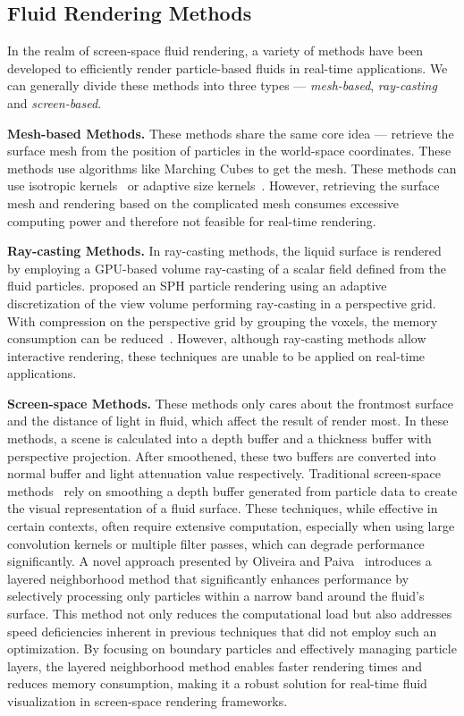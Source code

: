 \documentclass[sigconf]{acmart}
\begin{document}
\subsection{Fluid Rendering Methods}
In the realm of screen-space fluid rendering, a variety of methods have been developed to efficiently render particle-based fluids in real-time applications. We can generally divide these methods into three types --- \textit{mesh-based}, \textit{ray-casting} and \textit{screen-based}.

\textbf{Mesh-based Methods.} These methods share the same core idea --- retrieve the surface mesh from the position of particles in the world-space coordinates. These methods use algorithms like Marching Cubes to get the mesh. These methods
can use isotropic kernels~\cite{solenthaler2007unified} or adaptive size kernels~\cite{adams2007adaptively}. However, retrieving the surface mesh and rendering based on the complicated mesh consumes excessive computing power and therefore not feasible for real-time rendering.

\textbf{Ray-casting Methods.} In ray-casting methods, the liquid surface is rendered by employing a GPU-based volume ray-casting of a scalar field defined from the fluid particles. \citet{fraedrich2010efficient} proposed an SPH particle rendering using an adaptive discretization of the view volume performing ray-casting in a perspective grid. With compression on the perspective grid by grouping the voxels, the memory consumption can be reduced~\cite{zirr2015memory}. However, although ray-casting methods allow interactive rendering, these techniques are unable to be applied on
real-time applications.

\textbf{Screen-space Methods.} These methods only cares about the frontmost surface and the distance of light in fluid, which affect the result of render most. In these methods, a scene is calculated into a depth buffer and a thickness buffer with perspective projection. After smoothened, these two buffers are converted into normal buffer and light attenuation value respectively. Traditional screen-space methods~\cite{cords2009interactive, bagar2010layered} rely on smoothing a depth buffer generated from particle data to create the visual representation of a fluid surface. These techniques, while effective in certain contexts, often require extensive computation, especially when using large convolution kernels or multiple filter passes, which can degrade performance significantly. A novel approach presented by Oliveira and Paiva~\cite{oliveira2022narrow} introduces a layered neighborhood method that significantly enhances performance by selectively processing only particles within a narrow band around the fluid's surface. This method not only reduces the computational load but also addresses speed deficiencies inherent in previous techniques that did not employ such an optimization. By focusing on boundary particles and effectively managing particle layers, the layered neighborhood method enables faster rendering times and reduces memory consumption, making it a robust solution for real-time fluid visualization in screen-space rendering frameworks.
\end{document}
